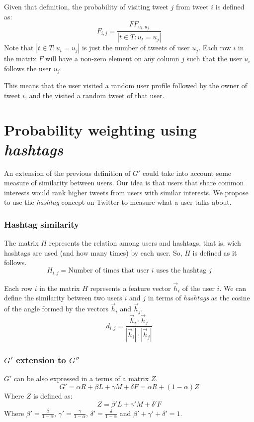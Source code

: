 \documentclass[12pt,a4paper]{article}
\begin{document}
Given that definition, the probability of visiting tweet $j$ from tweet $i$ is defined as:
\begin{equation}
F_{i,j} = \frac{FF_{u_i, u_j}}{ |t \in T : u_t = u_j|}
\end{equation}
Note that $|t \in T : u_t = u_j|$ is just the number of tweets of user $u_j$. Each row $i$ in the matrix $F$ will have a non-zero element on any column $j$ such that the user $u_i$ follows the user $u_j$.

This means that the user visited a random user profile followed by the owner of tweet $i$, and the visited a random tweet of that user. 


\section{Probability weighting using \emph{hashtags}}
An extension of the previous definition of $G'$ could take into account some measure of similarity between users. Our idea is that users that share common interests would rank higher tweets from users with similar interests. We propose to use the \emph{hashtag} concept on Twitter to measure what a user talks about.

\subsubsection*{Hashtag similarity}

The matrix $H$ represents the relation among users and hashtags, that is, wich hashtags are used (and how many times) by each user. So, $H$ is defined as it follows.
\begin{equation}
H_{i,j} = \text{Number of times that user } i \text{ uses the hashtag } j
\end{equation}

Each row $i$ in the matrix $H$ represents a feature vector $\vec{h}_i$ of the user $i$. We can define the similarity between two users $i$ and $j$ in terms of \emph{hashtags} as the cosine of the angle formed by the vectors $\vec{h}_i$ and $\vec{h}_j$.
\begin{equation}
d_{i,j} = \frac{\vec{h}_i \cdot \vec{h}_j}{ |\vec{h}_i| \cdot |\vec{h}_j|}
\end{equation}

\subsubsection*{$G'$ extension to $G''$}
$G'$ can be also expressed in a terms of a matrix $Z$.
\begin{equation}
G' = \alpha R + \beta L + \gamma M + \delta F =   \alpha R + (1-\alpha) Z
\end{equation}
Where $Z$ is defined as:
\begin{equation}
Z = \beta' L + \gamma' M + \delta' F 
\end{equation}
Where $\beta' = \frac{\beta}{1-\alpha}$, $\gamma' = \frac{\gamma}{1-\alpha}$, $\delta' = \frac{\delta}{1-\alpha}$ and $\beta' + \gamma' + \delta' = 1$. \\
\end{document}
